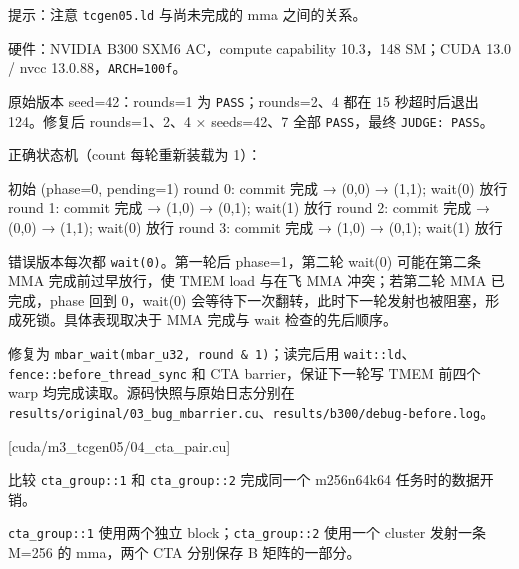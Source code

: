 \documentclass[11pt,a4paper,fontset=fandol]{ctexart}
\newenvironment{Shaded}{}{}
\newcommand{\NormalTok}[1]{#1}
\begin{document}
提示：注意 \texttt{tcgen05.\allowbreak{}ld} 与尚未完成的 mma
之间的关系。

\begin{answer}

硬件：NVIDIA B300 SXM6 AC，compute capability 10.3，148 SM；CUDA 13.0 /
nvcc 13.0.88，\texttt{ARCH=\allowbreak{}100f}。

原始版本 seed=42：rounds=1 为 \texttt{PASS}；rounds=2、4 都在 15
秒超时后退出 124。修复后 rounds=1、2、4 × seeds=42、7 全部
\texttt{PASS}，最终 \texttt{JUDGE:\allowbreak{}\ PASS}。

正确状态机（count 每轮重新装载为 1）：

\begin{Shaded}
\begin{Highlighting}[]
\NormalTok{初始 (phase=0, pending=1)}
\NormalTok{round 0: commit 完成 → (0,0) → (1,1); wait(0) 放行}
\NormalTok{round 1: commit 完成 → (1,0) → (0,1); wait(1) 放行}
\NormalTok{round 2: commit 完成 → (0,0) → (1,1); wait(0) 放行}
\NormalTok{round 3: commit 完成 → (1,0) → (0,1); wait(1) 放行}
\end{Highlighting}
\end{Shaded}

错误版本每次都 \texttt{wait(0)}。第一轮后 phase=1，第二轮 wait(0)
可能在第二条 MMA 完成前过早放行，使 TMEM load 与在飞 MMA 冲突；若第二轮
MMA 已完成，phase 回到 0，wait(0)
会等待下一次翻转，此时下一轮发射也被阻塞，形成死锁。具体表现取决于 MMA
完成与 wait 检查的先后顺序。

修复为
\texttt{mbar\_\allowbreak{}wait(mbar\_\allowbreak{}u32,\allowbreak{}\ round\ \&\ 1)}；读完后用
\texttt{wait:\allowbreak{}:\allowbreak{}ld}、\texttt{fence:\allowbreak{}:\allowbreak{}before\_\allowbreak{}thread\_\allowbreak{}sync}
和 CTA barrier，保证下一轮写 TMEM 前四个 warp
均完成读取。源码快照与原始日志分别在
\texttt{results/\allowbreak{}original/\allowbreak{}03\_\allowbreak{}bug\_\allowbreak{}mbarrier.\allowbreak{}cu}、\texttt{results/\allowbreak{}b300/\allowbreak{}debug-\allowbreak{}before.\allowbreak{}log}。

\end{answer}

[cuda/m3\_tcgen05/04\_cta\_pair.cu]

比较 \texttt{cta\_\allowbreak{}group:\allowbreak{}:\allowbreak{}1} 和
\texttt{cta\_\allowbreak{}group:\allowbreak{}:\allowbreak{}2} 完成同一个
m256n64k64 任务时的数据开销。

\texttt{cta\_\allowbreak{}group:\allowbreak{}:\allowbreak{}1}
使用两个独立
block；\texttt{cta\_\allowbreak{}group:\allowbreak{}:\allowbreak{}2}
使用一个 cluster 发射一条 M=256 的 mma，两个 CTA 分别保存 B
矩阵的一部分。
\end{document}
